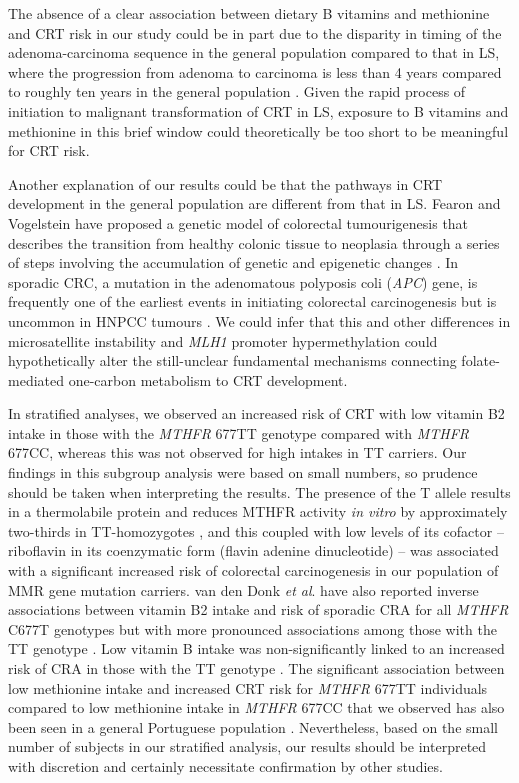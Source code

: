 \noindent The absence of a clear association between dietary B vitamins and methionine and CRT risk in our study could be in part due to the disparity in timing of the adenoma-carcinoma sequence in the general population compared to that in LS, where the progression from adenoma to carcinoma is less than 4 years \cite{c610,c644} compared to roughly ten years in the general population \cite{c645}. Given the rapid process of initiation to malignant transformation of CRT in LS, exposure to B vitamins and methionine in this brief window could theoretically be too short to be meaningful for CRT risk.

\noindent Another explanation of our results could be that the pathways in CRT development in the general population are different from that in LS. Fearon and Vogelstein have proposed a genetic model of colorectal tumourigenesis that describes the transition from healthy colonic tissue to neoplasia through a series of steps involving the accumulation of genetic and epigenetic changes \cite{c68}. In sporadic CRC, a mutation in the adenomatous polyposis coli (\emph{APC}) gene, is frequently one of the earliest events in initiating colorectal carcinogenesis \cite{c646} but is uncommon in HNPCC tumours \cite{c647}. We could infer that this and other differences in microsatellite instability and \emph{MLH1} promoter hypermethylation could hypothetically alter the still-unclear fundamental mechanisms connecting folate-mediated one-carbon metabolism to CRT development.

\noindent In stratified analyses, we observed an increased risk of CRT with low vitamin B2 intake in those with the \emph{MTHFR} 677TT genotype compared with \emph{MTHFR} 677CC, whereas this was not observed for high intakes in TT carriers. Our findings in this subgroup analysis were based on small numbers, so prudence should be taken when interpreting the results. The presence of the T allele results in a thermolabile protein and reduces MTHFR activity \emph{in vitro} by approximately two-thirds in TT-homozygotes \cite{c648}, and this coupled with low levels of its cofactor -- riboflavin in its coenzymatic form (flavin adenine dinucleotide) -- was associated with a significant increased risk of colorectal carcinogenesis in our population of MMR gene mutation carriers. van den Donk \emph{et al}. have also reported inverse associations between vitamin B2 intake and risk of sporadic CRA for all \emph{MTHFR} C677T genotypes but with more pronounced associations among those with the TT genotype \cite{c621}. Low vitamin B intake was non-significantly linked to an increased risk of CRA in those with the TT genotype \cite{c621}. The significant association between low methionine intake and increased CRT risk for \emph{MTHFR} 677TT individuals compared to low methionine intake in \emph{MTHFR} 677CC that we observed has also been seen in a general Portuguese population \cite{c649}. Nevertheless, based on the small number of subjects in our stratified analysis, our results should be interpreted with discretion and certainly necessitate confirmation by other studies.

